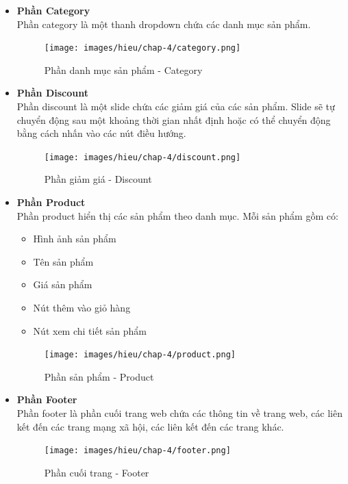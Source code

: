 \begin{itemize}
    \item \textbf{Phần Category}
    \\[0.2cm]
    Phần category là một thanh dropdown chứa các danh mục sản phẩm.
    \begin{figure}[H]
        \begin{center}
        \texttt{[image: images/hieu/chap-4/category.png]}
        \vspace*{5mm}
        \caption{Phần danh mục sản phẩm - Category}
        \end{center}
    \end{figure}
    \item \textbf{Phần Discount}
    \\[0.2cm]
    Phần discount là một slide chứa các giảm giá của các sản phẩm. Slide sẽ tự chuyển động sau một khoảng thời gian nhất định hoặc có thể chuyển động bằng cách nhấn vào các nút điều hướng.
    \begin{figure}[H]
        \begin{center}
        \texttt{[image: images/hieu/chap-4/discount.png]}
        \vspace*{5mm}
        \caption{Phần giảm giá - Discount}
        \end{center}
    \end{figure}
    \item \textbf{Phần Product}
    \\[0.2cm]
    Phần product hiển thị các sản phẩm theo danh mục. Mỗi sản phẩm gồm có:
    \begin{itemize}
        \item Hình ảnh sản phẩm
        \item Tên sản phẩm
        \item Giá sản phẩm
        \item Nút thêm vào giỏ hàng
        \item Nút xem chi tiết sản phẩm
    \end{itemize}
    \begin{figure}[H]
        \begin{center}
        \texttt{[image: images/hieu/chap-4/product.png]}
        \vspace*{5mm}
        \caption{Phần sản phẩm - Product}
        \end{center}
    \end{figure}
    \item \textbf{Phần Footer}
    \\[0.2cm]
    Phần footer là phần cuối trang web chứa các thông tin về trang web, các liên kết đến các trang mạng xã hội, các liên kết đến các trang khác.
    \begin{figure}[H]
        \begin{center}
        \texttt{[image: images/hieu/chap-4/footer.png]}
        \vspace*{5mm}
        \caption{Phần cuối trang - Footer}
        \end{center}
    \end{figure}
\end{itemize}
